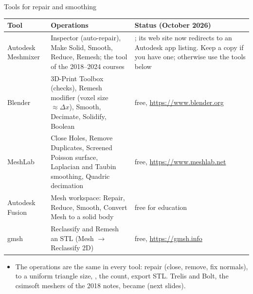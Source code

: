 \documentclass[aspectratio=169,11pt]{beamer}
\begin{document}
\begin{frame}{Tools for repair and smoothing}
\scriptsize
\begin{tabular}{@{}L{0.16\textwidth}L{0.45\textwidth}L{0.32\textwidth}@{}}
\toprule
Tool & Operations & Status (October 2026)\\
\midrule
Autodesk Meshmixer & Inspector (auto-repair), Make Solid, Smooth, Reduce, Remesh; the tool of the 2018--2024 courses & ; its web site now redirects to an Autodesk app listing. Keep a copy if you have one; otherwise use the tools below\\
Blender & 3D-Print Toolbox (checks), Remesh modifier (voxel size $\approx \Delta x$), Smooth, Decimate, Solidify, Boolean & free, \url{https://www.blender.org}\\
MeshLab & Close Holes, Remove Duplicates, Screened Poisson surface, Laplacian and Taubin smoothing, Quadric decimation & free, \url{https://www.meshlab.net}\\
Autodesk Fusion & Mesh workspace: Repair, Reduce, Smooth, Convert Mesh to a solid body & free for education\\
gmsh & Reclassify and Remesh an STL (Mesh $\to$ Reclassify 2D) & free, \url{https://gmsh.info}\\
\bottomrule
\end{tabular}
\vspace{1mm}
\begin{itemize}
  \item The operations are the same in every tool: repair (close, remove, fix normals),  to a uniform triangle size, ,  the count, export STL. Trelis and Bolt, the csimsoft meshers of the 2018 notes, became  (next slides).
\end{itemize}
\end{frame}
\end{document}
